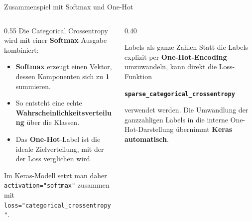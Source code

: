 \begin{frame}[fragile]{Zusammenspiel mit Softmax und One-Hot}
  \footnotesize
\begin{columns}
\begin{column}{0.55\textwidth}
Die Categorical Crossentropy wird mit einer \textbf{Softmax}-Ausgabe kombiniert:
\begin{itemize}
\item \textbf{Softmax} erzeugt einen Vektor, dessen Komponenten sich zu \textbf{1} summieren.
\item So entsteht eine echte \textbf{Wahrscheinlichkeitsverteilung} über die Klassen.
\item Das \textbf{One-Hot}-Label ist die ideale Zielverteilung, mit der der Loss verglichen wird.
\end{itemize}

\vspace{0.3em}
Im Keras-Modell setzt man daher \texttt{activation="softmax"} zusammen mit \texttt{loss="categorical\_crossentropy"}.

\end{column}
\begin{column}{0.40\textwidth}
\begin{block}{\footnotesize Labels als ganze Zahlen}
Statt die Labels explizit per \textbf{One-Hot-Encoding} umzuwandeln, kann direkt die Loss-Funktion
\begin{center}
\texttt{\textbf{sparse\_categorical\_crossentropy}}
\end{center}
verwendet werden. Die Umwandlung der ganzzahligen Labels in die interne One-Hot-Darstellung übernimmt \textbf{Keras automatisch}.
\end{block}
\end{column}
\end{columns}
\end{frame}


